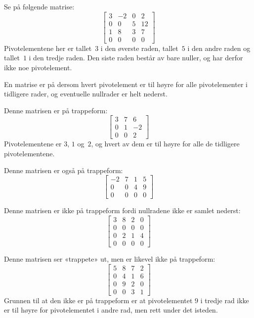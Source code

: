 \begin{ex}
\label{ex:pivotelement}
Se på følgende matrise:
\[
\begin{bmatrix}
3 & -2 & 0 & 2 \\
0 &  0  & 5 & 12 \\
1 &  8 & 3 & 7 \\
0 &  0  & 0 & 0
\end{bmatrix}
\]
Pivotelementene her er tallet~$3$ i den øverste raden, tallet~$5$ i
den andre raden og tallet~$1$ i den tredje raden.  Den siste raden
består av bare nuller, og har derfor ikke noe pivotelement.
\end{ex}

\begin{defn}
En matrise er på  dersom hvert pivotelement er til
høyre for alle pivotelementer i tidligere rader, og eventuelle
nullrader er helt nederst.
\end{defn}

\begin{ex}
\label{ex:trappeform}
Denne matrisen er på trappeform:
\[
\begin{bmatrix}
3 & 7 & 6 \\
0 & 1 & -2 \\
0 & 0 & 2
\end{bmatrix}
\]
Pivotelementene er $3$, $1$ og~$2$, og hvert av dem er til høyre for
alle de tidligere pivotelementene.

Denne matrisen er også på trappeform:
\[
\begin{bmatrix}
-2 & 7 & 1 & 5 \\
 0 & 0 & 4 & 9 \\
 0 & 0 & 0 & 0
\end{bmatrix}
\]

Denne matrisen er ikke på trappeform fordi nullradene ikke er samlet
nederst:
\[
\begin{bmatrix}
3 & 8 & 2 & 0 \\
0 & 0 & 0 & 0 \\
0 & 2 & 1 & 4 \\
0 & 0 & 0 & 0
\end{bmatrix}
\]

Denne matrisen ser «trappete» ut, men er likevel ikke på trappeform:
\[
\begin{bmatrix}
5 & 8 & 7 & 2 \\
0 & 4 & 1 & 6 \\
0 & 9 & 2 & 0 \\
0 & 0 & 3 & 1
\end{bmatrix}
\]
Grunnen til at den ikke er på trappeform er at pivotelementet $9$ i
tredje rad ikke er til høyre for pivotelementet i andre rad, men rett
under det isteden.
\end{ex}

